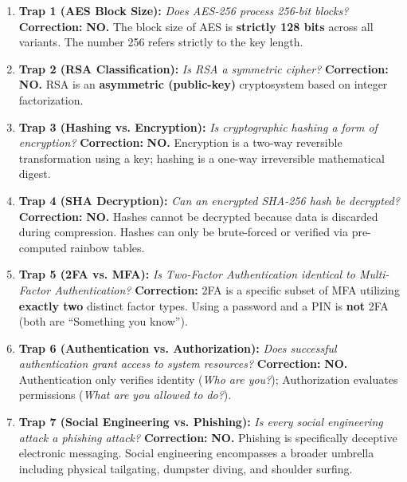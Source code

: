 \begin{enumerate}
\item \textbf{Trap 1 (AES Block Size):} \textit{Does AES-256 process 256-bit blocks?} \newline
\textbf{Correction:} \textbf{NO.} The block size of AES is \textbf{strictly 128 bits} across all variants. The number 256 refers strictly to the key length.
\item \textbf{Trap 2 (RSA Classification):} \textit{Is RSA a symmetric cipher?} \newline
\textbf{Correction:} \textbf{NO.} RSA is an \textbf{asymmetric (public-key)} cryptosystem based on integer factorization.
\item \textbf{Trap 3 (Hashing vs. Encryption):} \textit{Is cryptographic hashing a form of encryption?} \newline
\textbf{Correction:} \textbf{NO.} Encryption is a two-way reversible transformation using a key; hashing is a one-way irreversible mathematical digest.
\item \textbf{Trap 4 (SHA Decryption):} \textit{Can an encrypted SHA-256 hash be decrypted?} \newline
\textbf{Correction:} \textbf{NO.} Hashes cannot be decrypted because data is discarded during compression. Hashes can only be brute-forced or verified via pre-computed rainbow tables.
\item \textbf{Trap 5 (2FA vs. MFA):} \textit{Is Two-Factor Authentication identical to Multi-Factor Authentication?} \newline
\textbf{Correction:} 2FA is a specific subset of MFA utilizing \textbf{exactly two} distinct factor types. Using a password and a PIN is \textbf{not} 2FA (both are ``Something you know'').
\item \textbf{Trap 6 (Authentication vs. Authorization):} \textit{Does successful authentication grant access to system resources?} \newline
\textbf{Correction:} \textbf{NO.} Authentication only verifies identity (\textit{Who are you?}); Authorization evaluates permissions (\textit{What are you allowed to do?}).
\item \textbf{Trap 7 (Social Engineering vs. Phishing):} \textit{Is every social engineering attack a phishing attack?} \newline
\textbf{Correction:} \textbf{NO.} Phishing is specifically deceptive electronic messaging. Social engineering encompasses a broader umbrella including physical tailgating, dumpster diving, and shoulder surfing.

\end{enumerate}

